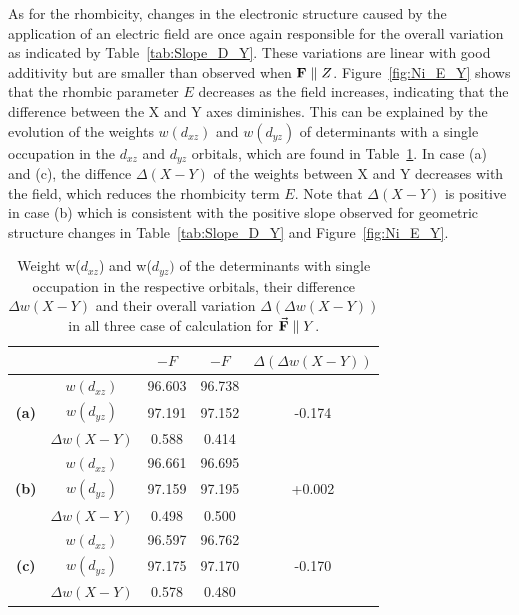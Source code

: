 \documentclass[12pt,a4paper]{report}
\numberwithin{equation}{section}
\begin{document}
As for the rhombicity, changes in the electronic structure caused by the application of an electric field are once again responsible for the overall variation as indicated by Table~\ref{tab:Slope_D_Y}.
These variations are linear with good additivity but are smaller than observed when $\vb{F}\parallel Z$. 
Figure~\ref{fig:Ni_E_Y} shows that the rhombic parameter $E$ decreases as the field increases, indicating that the difference between the X and Y axes diminishes.
This can be explained by the evolution of the weights $w(d_{xz})$ and $w(d_{yz})$ of determinants with a single occupation in the $d_{xz}$ and $d_{yz}$ orbitals, which are found in Table~\ref{tab:PoidsY}.
In case (a) and (c), the diffence $\Delta (X-Y)$ of the weights between X and Y decreases with the field, which reduces the rhombicity term $E$.
Note that $\Delta (X-Y)$ is positive in case (b) which is consistent with the positive slope observed for geometric structure changes in Table~\ref{tab:Slope_D_Y} and Figure~\ref{fig:Ni_E_Y}.


\begin{table}[h]
    \centering
    \begin{tabular}{c | c | c c | c }
        & &  $-F$ & $-F$ & $\Delta (\Delta w(X-Y))$\\
        \hline
        \multirow{3}{*}{\textbf{(a)}}
        &$w(d_{xz})$ &  96.603 & 96.738 & \\
        &$w(d_{yz})$ &  97.191 & 97.152 & -0.174\\
        &$\Delta w(X-Y)$ & 0.588 & 0.414& \\
        \hline
        \multirow{3}{*}{\textbf{(b)}}
        &$w(d_{xz})$ &  96.661 & 96.695 & \\
        &$w(d_{yz})$ &  97.159 & 97.195 & +0.002\\
        &$\Delta w(X-Y)$ & 0.498 & 0.500& \\
        \hline
        \multirow{3}{*}{\textbf{(c)}}
        &$w(d_{xz})$ &  96.597 & 96.762 & \\
        &$w(d_{yz})$ &  97.175 & 97.170 & -0.170\\
        &$\Delta w(X-Y)$ & 0.578 & 0.480& \\
        \hline
    \end{tabular}
    \caption{Weight w($d_{xz}$) and w($d_{yz})$ of the determinants with single occupation in the respective orbitals, their difference $\Delta w(X-Y)$ and their overall variation $\Delta (\Delta w(X-Y))$ in all three case of calculation for $\vec{\vb{F}}\parallel Y$.}
    \label{tab:PoidsY}
\end{table}
\end{document}
